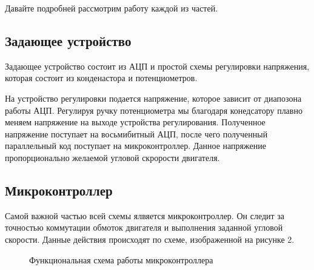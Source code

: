 \documentclass[russian, utf8]{eskdtext}
\begin{document}
Давайте подробней рассмотрим работу каждой из частей.

\subsection{Задающее устройство}

Задающее устройство состоит из АЦП и простой схемы регулировки напряжения, которая состоит из конденастора и потенциометров. \par
На устройство регулировки подается напряжение, которое зависит от диапозона работы АЦП. Регулируя ручку потенциометра мы благодаря конедсатору плавно меняем напряжение на выходе устройства регулирования. Полученное напряжение поступает на восьмибитный АЦП, после чего полученный параллельный код поступает на микроконтроллер. Данное напряжение пропорционально желаемой угловой скрорости двигателя.

\subsection{Микроконтроллер}

Самой важной частью всей схемы ялвяется микроконтроллер. Он следит за точностью коммутации обмоток двигателя и выполнения заданной угловой скорости. Данные действия происходят по схеме, изображенной на рисунке 2.
\begin{figure} [h!]
	\centering
	\caption{Функциональная схема работы микроконтроллера}
\end{figure}
\end{document}
